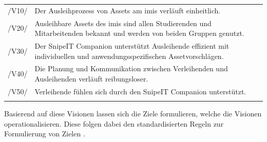 \begin{center}
        \renewcommand{\arraystretch}{1.5}
        \begin{longtable}{lp{}}
                \arrayrulecolor{maincolor}\hline
                \sffamily\color{maincolor}/V10/ & Der Ausleihprozess von Assets am \ac{imis} verläuft einheitlich.\\
                \sffamily\color{maincolor}/V20/ & Ausleihbare Assets des \ac{imis} sind allen Studierenden und
                Mitarbeitenden bekannt und werden von beiden Gruppen genutzt.\\
                \sffamily\color{maincolor}/V30/ & Der SnipeIT Companion unterstützt Ausleihende effizient mit
                individuellen und anwendungsspezifischen Assetvorschlägen.\\
                \sffamily\color{maincolor}/V40/ & Die Planung und Kommunikation zwischen Verleihenden und
                Ausleihenden verläuft reibungsloser.\\
                \sffamily\color{maincolor}/V50/ & Verleihende fühlen sich durch den SnipeIT Companion unterstützt.\\
                \arrayrulecolor{maincolor}\hline
        \end{longtable}
\end{center}
\vspace*{-1.5cm}

Basierend auf diese Visionen lassen sich die Ziele formulieren, welche die Visionen
operationalisieren. Diese folgen dabei den standardisierten Regeln zur Formulierung von Zielen
\cite{pohl_requirements_2008}.

